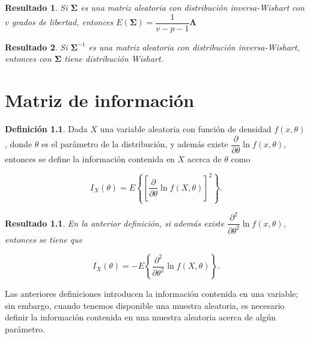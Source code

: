 \documentclass[
  10pt,
  spanish,
]{book}
\newtheorem{proposition}{Resultado}[chapter]
\theoremstyle{definition}
\newtheorem{definition}{Definición}[chapter]
\theoremstyle{definition}
\theoremstyle{definition}
\theoremstyle{definition}
\theoremstyle{remark}
\begin{document}
\begin{proposition}
\protect\hypertarget{prp:unnamed-chunk-63}{}{\label{prp:unnamed-chunk-63} }Si \(\boldsymbol \Sigma\) es una matriz aleatoria con distribución inversa-Wishart con \(v\) grados de libertad, entonces \(E(\boldsymbol \Sigma)=\dfrac{1}{v-p-1}\boldsymbol \Lambda\)
\end{proposition}

\begin{proposition}
\protect\hypertarget{prp:unnamed-chunk-64}{}{\label{prp:unnamed-chunk-64} }Si \(\boldsymbol \Sigma^{-1}\) es una matriz aleatoria con distribución inversa-Wishart, entonces con \(\boldsymbol \Sigma\) tiene distribución Wishart.
\end{proposition}

\hypertarget{matriz-de-informaciuxf3n}{%
\chapter{Matriz de información}\label{matriz-de-informaciuxf3n}}

\begin{definition}
\protect\hypertarget{def:unnamed-chunk-1}{}{\label{def:unnamed-chunk-1} }Dada \(X\) una variable aleatoria con función de densidad \(f(x,\theta)\), donde \(\theta\) es el parámetro de la distribución, y además existe \(\dfrac{\partial}{\partial\theta}\ln{f(x,\theta)}\), entonces se define la información contenida en \(X\) acerca de \(\theta\) como

\begin{equation}
I_X(\theta)=E\left\{\left[\frac{\partial}{\partial\theta}\ln{f(X,\theta)}\right]^2\right\}.
\end{equation}
\end{definition}

\begin{proposition}
\protect\hypertarget{prp:unnamed-chunk-2}{}{\label{prp:unnamed-chunk-2} }En la anterior definición, si además existe \(\dfrac{\partial^2}{\partial\theta^2}\ln{f(x,\theta)}\), entonces se tiene que

\begin{equation}
I_X(\theta)=-E\left\{\dfrac{\partial^2}{\partial\theta^2}\ln{f(X,\theta)}\right\}.
\end{equation}
\end{proposition}

Las anteriores definiciones introducen la información contenida en una variable; sin embargo, cuando tenemos disponible una muestra aleatoria, es necesario definir la información contenida en una muestra aleatoria acerca de algún parámetro.
\end{document}
